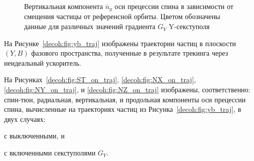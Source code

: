 \begin{figure}[H]
	\centering
\end{figure}
\begin{figure}[H]\centering
	\caption{Вертикальная компонента $\bar n_y$ оси прецессии спина в зависимости от смещения частицы от референсной орбиты.\label{decoh:fig:ny_vs_y0_GSY}
		Цветом обозначены данные для различных значений градиента $G_Y$ Y-секступоля}
\end{figure}

На Рисунке~\ref{decoh:fig:yb_traj} изображены траектории частиц в плоскости $(Y,B)$ фазового пространства, полученные в результате трекинга через неидеальный ускоритель.

На Рисунках~\ref{decoh:fig:ST_on_traj}, \ref{decoh:fig:NX_on_traj}, \ref{decoh:fig:NY_on_traj}, и \ref{decoh:fig:NZ_on_traj} изображены, соответственно: спин-тюн, радиальная, вертикальная, и продольная компоненты оси прецессии спина, вычисленные на траекториях частиц из Рисунка~\ref{decoh:fig:yb_traj}, в двух случаях:
\begin{enumerate*}
	\item с выключенными, и 
	\item с включенными секступолями $G_Y$.
\end{enumerate*}  

